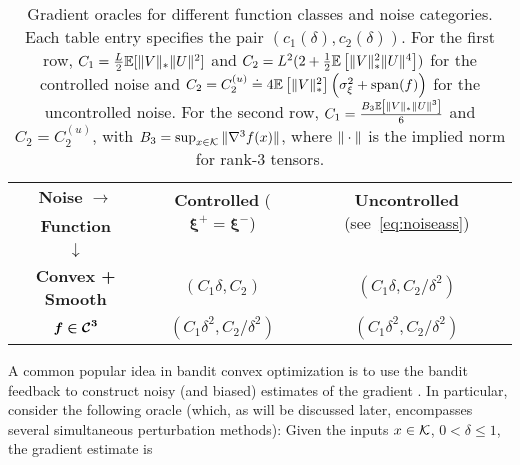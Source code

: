 \begin{table*}
\centering
\begin{tabular}{|c|c|c|}
\toprule
\textbf{Noise }$\bm{ \rightarrow}$ & \multirow{2}{*}{\textbf{Controlled }($\bm{\xi^+ = \xi^-}$)} & \multirow{2}{*}{\textbf{Uncontrolled }(see~\eqref{eq:noiseass})} \\ 
\textbf{Function } &&\\
$\bm{\downarrow}$ &&\\\midrule
\multirow{2}{*}{\textbf{Convex + Smooth}} & \multirow{2}{*}{$(C_1 \delta, C_2)$} & \multirow{2}{*}{$(C_1\delta, C_2/\delta^2)$}\\ 
 &&\\\midrule
\multirow{2}{*}{$\bm{f \in \mathcal{C}^3}$} & \multirow{2}{*}{$(C_1 \delta^2, C_2/\delta^2)$} & \multirow{2}{*}{$(C_1 \delta^2, C_2/\delta^2)$} \\ 
 &&\\\bottomrule
\end{tabular}
\caption{Gradient oracles for different function classes and noise categories. Each table entry specifies the pair $(c_1(\delta), c_2(\delta))$.
For the first row, $C_1 =
\frac{L}{2} \mathbb{E}[ \|V\|_* \|U\|^2]$ and
$C_2 =   L^2 (2 + \frac{1}{2}\mathbb{E}\left[ \|V\|_*^2 \|U\|^4 \right])$
for the controlled noise and 
 $C_2 =  C_{2}^{(u)} \doteq 4 \mathbb{E}\left[\|V\|_*^2\right]\left( \sigma_\xi^2+\operatorname{span}(f)\right)$ for the uncontrolled noise.
For the second row, $C_1 = \frac{B_3 \mathbb{E}\left[ \|V\|_* \|U\|^3 \right]}{6}$ and $C_2 =  C_{2}^{(u)}$,
with $B_3 = \sup_{x\in \mathcal{K}} \|\nabla^3 f(x)\|$, where $\|\cdot\|$ is the implied norm for rank-3 tensors.
}
\label{tab:oracles}
\end{table*}
A common popular idea in bandit convex optimization is to use the bandit feedback to construct noisy (and biased) estimates of the gradient \cite{XXXXX}.
In particular, consider the following oracle (which, as will be discussed later, 
 encompasses several simultaneous perturbation methods):
Given the inputs $x\in \mathcal{K}$,  $0<\delta\le 1$,  
the gradient estimate is
